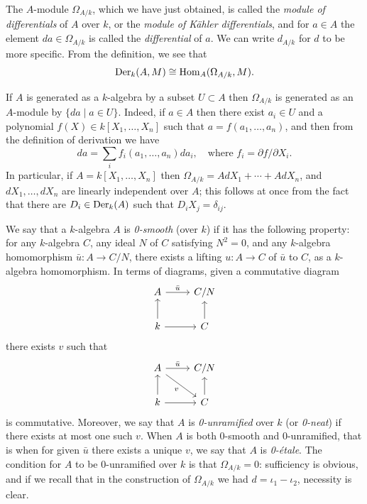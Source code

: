 The $A$-module $\Omega_{A/k}$, which we have just obtained, is called the \emph{module of
differentials} of $A$ over $k$, or the \emph{module of K\"ahler differentials}, and for
$a \in A$ the element $da \in \Omega_{A/k}$ is called the \emph{differential} of $a$. We can write
$d_{A/k}$ for $d$ to be more specific. From the definition, we see that
\[
  \operatorname{Der}_k(A, M) \cong \operatorname{Hom}_A(\Omega_{A/k}, M).
\]

\begin{example*}
If $A$ is generated as a $k$-algebra by a subset $U \subset A$ then $\Omega_{A/k}$ is
generated as an $A$-module by $\{da \mid a \in U\}$. Indeed, if $a \in A$ then there
exist $a_i \in U$ and a polynomial $f(X) \in k[X_1, \ldots, X_n]$ such that
$a = f(a_1, \ldots, a_n)$, and then from the definition of derivation we have
\[
  da = \sum_i f_i(a_1, \ldots, a_n)da_i, \quad \text{where } f_i = \partial f/\partial X_i.
\]
In particular, if $A = k[X_1, \ldots, X_n]$ then $\Omega_{A/k} = AdX_1 + \cdots + AdX_n$, and
$dX_1, \ldots, dX_n$ are linearly independent over $A$; this follows at once from the
fact that there are $D_i \in \operatorname{Der}_k(A)$ such that $D_iX_j = \delta_{ij}$.
\end{example*}

We say that a $k$-algebra $A$ is \emph{0-smooth} (over $k$) if it has the following
property: for any $k$-algebra $C$, any ideal $N$ of $C$ satisfying $N^2 = 0$, and any
$k$-algebra homomorphism $\bar{u}\colon A \to C/N$, there exists a lifting $u\colon A \to C$
of $\bar{u}$ to $C$, as a $k$-algebra homomorphism. In terms of diagrams, given a
commutative diagram
\[
\begin{tikzcd}
A \arrow[r, "\bar{u}"] & C/N \\
k \arrow[u] \arrow[r] & C \arrow[u]
\end{tikzcd}
\]
there exists $v$ such that
\[
\begin{tikzcd}
A \arrow[r, "\bar{u}"] \arrow[rd, "v"'] & C/N \\
k \arrow[u] \arrow[r] & C \arrow[u]
\end{tikzcd}
\]
is commutative. Moreover, we say that $A$ is \emph{0-unramified} over $k$ (or \emph{0-neat})
if there exists at most one such $v$. When $A$ is both 0-smooth and
0-unramified, that is when for given $\bar{u}$ there exists a unique $v$, we say that
$A$ is \emph{0-\'etale}. The condition for $A$ to be 0-unramified over $k$ is that
$\Omega_{A/k} = 0$: sufficiency is obvious, and if we recall that in the construction of
$\Omega_{A/k}$ we had $d = \iota_1 - \iota_2$, necessity is clear.

